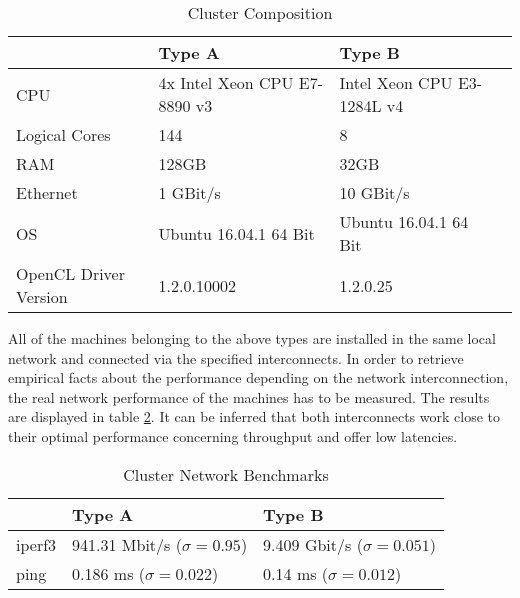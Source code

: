 \begin{table}[htb]
	\centering
	\begin{adjustbox}{width=0.7\textwidth}
		\small
		\begin{tabular}{l | l | l | l}
			~                     & Type A                  	& Type B                  \\
			\hline
			CPU                   &  4x Intel Xeon CPU E7-8890 v3 	& Intel Xeon CPU E3-1284L v4 \\
			Logical Cores         &  144 	& 8 \\
			RAM                   &  128GB                       	& 32GB                       \\
			Ethernet	          &  1 GBit/s                  	& 10 GBit/s                  \\
			OS                    &  Ubuntu 16.04.1 64 Bit      	& Ubuntu 16.04.1 64 Bit      \\
			OpenCL Driver Version &  1.2.0.10002                   & 1.2.0.25                   \\
		\end{tabular}
	\end{adjustbox}

	\caption{Cluster Composition}
	\label{table:cluster_setup_1}
\end{table}

All of the machines belonging to the above types are installed in the same local network and connected via the specified interconnects. In order to retrieve empirical facts about the performance depending on the network interconnection, the real network performance of the machines has to be measured. The results are displayed in table \ref{table:cluster_interconnect_benchmarks}. It can be inferred that both interconnects work close to their optimal performance concerning throughput and offer low latencies.

\begin{table}[!htb]
	\centering
	\begin{adjustbox}{width=0.5\textwidth}
		\small
		\begin{tabular}{l | l | l}
			~                     & Type A                 			& Type B                  \\
			\hline
			iperf3                & 941.31 Mbit/s ($\sigma = 0.95$) 	& 9.409 Gbit/s ($\sigma = 0.051$) \\
			ping                  & 0.186 ms ($\sigma = 0.022$)  		& 0.14 ms ($\sigma = 0.012$)  \\
		\end{tabular}
	\end{adjustbox}

	\caption{Cluster Network Benchmarks}
	\label{table:cluster_interconnect_benchmarks}
\end{table}

